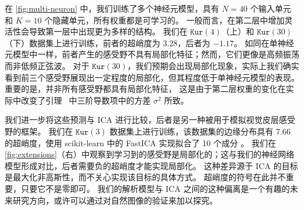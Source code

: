 
在 \cref{fig:multi-neuron} 中，我们训练了多个神经元模型，具有 $N=40$ 个输入单元和 $K=10$ 个隐藏单元，所有权重都是可学习的。
一般而言，在第二层中增加灵活性会导致第一层中出现更为多样的结构。
我们在 $\texttt{Kur}(4)$（上）和 $\texttt{Kur}(30)$（下）数据集上进行训练，前者的超峭度为 $3.28$，后者为 $-1.17$。
如同在单神经元模型中一样，前者产生的感受野不具有局部化特征；然而，它们更像是高频振荡而非低频正弦波。
对于 $\texttt{Kur}(30)$，我们预期会出现局部化现象，实际上我们确实看到前三个感受野展现出一定程度的局部化，但其程度低于单神经元模型的表现。
重要的是，并非所有感受野都具有局部化特征，
这是由于第二层权重的变化在实际中改变了引理~ 中三阶导数项中的方差 $\sigma^2$ 所致。

我们进一步将这些预测与 ICA 进行比较，后者是另一种被用于模拟视觉皮层感受野的框架。
我们在 $\texttt{Kur}(3)$ 数据集上进行训练，该数据集的边缘分布具有 $7.66$ 的超峭度，使用 scikit-learn 中的 FastICA 实现拟合了 10 个成分 \parencite{hyvarinen2000independent,scikit-learn}。
我们在 \cref{fig:extensions}（右）中观察到学习到的感受野是局部化的；这与我们的神经网络模型形成对比，后者需要负的超峭度才能实现局部化。
这种差异源于 ICA 的目标是最大化非高斯性，而不关心实现该目标的具体方式。
超峭度的符号在此并不重要，只要它不是零即可。
我们的解析模型与 ICA 之间的这种偏离是一个有趣的未来研究方向，或许可以通过对自然图像的验证来加以探究。
